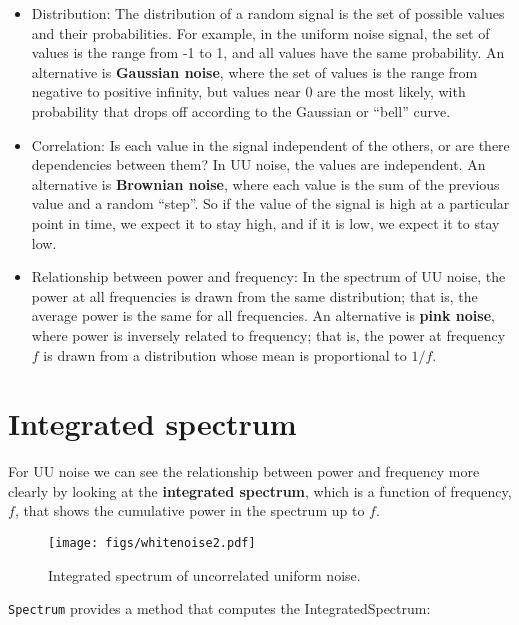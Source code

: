 \begin{itemize}
	
	\item Distribution: The distribution of a random signal is the set of
	possible values and their probabilities.  For example, in the
	uniform noise signal, the set of values is the range from -1 to 1,
	and all values have the same probability.  An alternative is
	{\bf Gaussian noise}, where the set of values is the range from negative
	to positive infinity, but values near 0 are the most likely, with
	probability that drops off according to the Gaussian or
	``bell'' curve.
	
	\item Correlation: Is each value in the signal independent of the
	others, or are there dependencies between them?  In UU noise, the
	values are independent.
	An alternative is {\bf Brownian noise}, where each value is the sum
	of the previous value and a random ``step''.  So if the value of the
	signal is high at a particular point in time, we expect it to stay
	high, and if it is low, we expect
	it to stay low.
	
	\item Relationship between power and frequency: In the spectrum of UU
	noise, the power at all frequencies is drawn from the same
	distribution; that is, the average power is the same for all
	frequencies.  An alternative is {\bf pink noise}, where power is
	inversely related to frequency; that is, the power at frequency $f$
	is drawn from a distribution whose mean is proportional to $1/f$.
	
\end{itemize}


\section{Integrated spectrum}

For UU noise we can see the relationship between power and frequency
more clearly by looking at the {\bf integrated spectrum}, which
is a function of frequency, $f$, that shows the cumulative power in
the spectrum up to $f$.

\begin{figure}
	\centerline{\texttt{[image: figs/whitenoise2.pdf]}}
	\caption{Integrated spectrum of uncorrelated uniform noise.}
	\label{fig.whitenoise2}
\end{figure}

{\tt Spectrum} provides a method that computes the IntegratedSpectrum:


